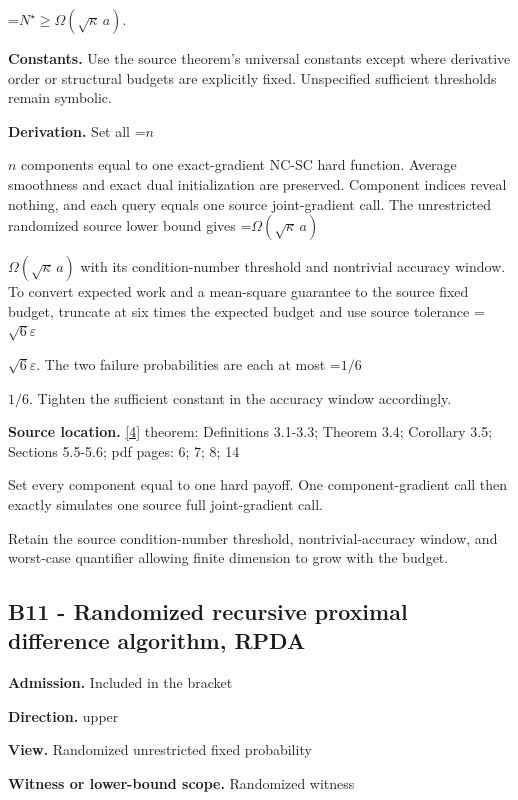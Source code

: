 \documentclass[10pt,a4paper]{article}
\newcommand{\AtlasMath}[1]{\par\begingroup\centering\setbox0=\hbox{$\displaystyle #1$}\ifdim\wd0>1.4\linewidth\typeout{ATLAS WIDE FORMULA: \the\wd0}\fi\ifdim\wd0>\linewidth\resizebox{\linewidth}{!}{\box0}\else\box0\fi\par\endgroup}
\newcommand{\AtlasInlineMath}[1]{\begingroup\setbox0=\hbox{$#1$}\ifdim\wd0>.4\linewidth\endgroup\AtlasMath{#1}\else\endgroup$#1$\fi}
\begin{document}
\AtlasMath{N^\star\ge\Omega(\sqrt\kappa\,a).}


\textbf{Constants.} Use the source theorem’s universal constants except where derivative order or structural budgets are explicitly fixed. Unspecified sufficient thresholds remain symbolic.



\textbf{Derivation.} Set all \AtlasInlineMath{n} components equal to one exact-gradient NC-SC hard function. Average smoothness and exact dual initialization are preserved. Component indices reveal nothing, and each query equals one source joint-gradient call. The unrestricted randomized source lower bound gives \AtlasInlineMath{\Omega(\sqrt\kappa\,a)} with its condition-number threshold and nontrivial accuracy window. To convert expected work and a mean-square guarantee to the source fixed budget, truncate at six times the expected budget and use source tolerance \AtlasInlineMath{\sqrt6\varepsilon}. The two failure probabilities are each at most \AtlasInlineMath{1/6}. Tighten the sufficient constant in the accuracy window accordingly.



\textbf{Source location.} \href{https://arxiv.org/pdf/2610.00229v2}{[4]} theorem: Definitions 3.1-3.3; Theorem 3.4; Corollary 3.5; Sections 5.5-5.6; pdf pages: 6; 7; 8; 14



Set every component equal to one hard payoff. One component-gradient call then exactly simulates one source full joint-gradient call.



Retain the source condition-number threshold, nontrivial-accuracy window, and worst-case quantifier allowing finite dimension to grow with the budget.



\subsection{B11 - Randomized recursive proximal difference algorithm, RPDA}


\textbf{Admission.} Included in the bracket



\textbf{Direction.} upper



\textbf{View.} Randomized unrestricted fixed probability



\textbf{Witness or lower-bound scope.} Randomized witness
\end{document}
